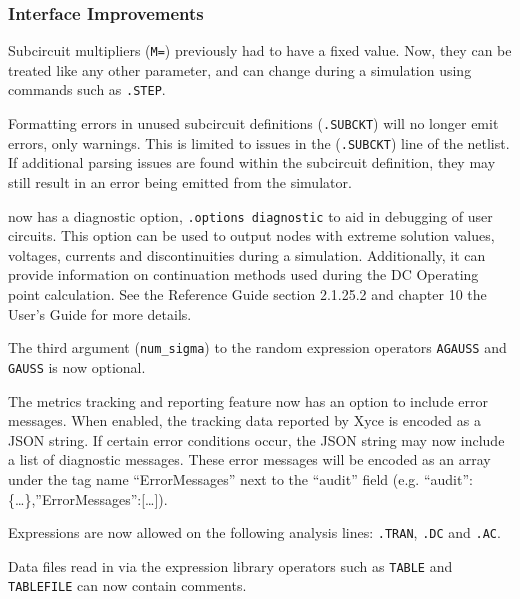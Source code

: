 \documentclass[letterpaper]{scrartcl}
\begin{document}
\subsubsection*{Interface Improvements}
\begin{XyceItemize}
\item Subcircuit multipliers (\texttt{M=}) previously had to have a fixed value.  
  Now, they can be treated like any other parameter, and can change during a simulation 
  using commands such as \texttt{.STEP}. 

\item Formatting errors in unused subcircuit definitions (\texttt{.SUBCKT}) will no
  longer emit errors, only warnings.  This is limited to issues in the (\texttt{.SUBCKT})
  line of the netlist.  If additional parsing issues are found within the subcircuit
  definition, they may still result in an error being emitted from the simulator.
 
\item \Xyce{} now has a diagnostic option, \texttt{.options diagnostic} to aid in 
  debugging of user circuits.  This option can be used to output nodes with extreme 
  solution values, voltages, currents and discontinuities during a simulation. 
  Additionally, it can provide information on continuation methods used during 
  the DC Operating point calculation.  See the Reference Guide section 2.1.25.2 
  and chapter 10 the User's Guide for more details.

\item The third argument (\texttt{num\_sigma}) to the random expression operators \texttt{AGAUSS} and \texttt{GAUSS} is now optional.

\item The metrics tracking and reporting feature now has an option to include 
  error messages. When enabled, the tracking data reported by Xyce is encoded as
  a JSON string. If certain error conditions occur, the JSON string may now
  include a list of diagnostic messages. These error messages will be encoded as
  an array under the tag name “ErrorMessages” next to the “audit” field 
  (e.g. {“audit”:\{\dots\},”ErrorMessages”:[\dots]}). 

\item Expressions are now allowed on the following analysis lines: \texttt{.TRAN}, \texttt{.DC} and \texttt{.AC}.

\item Data files read in via the expression library operators such as \texttt{TABLE} and \texttt{TABLEFILE} can now contain comments.


\end{XyceItemize}
\end{document}
